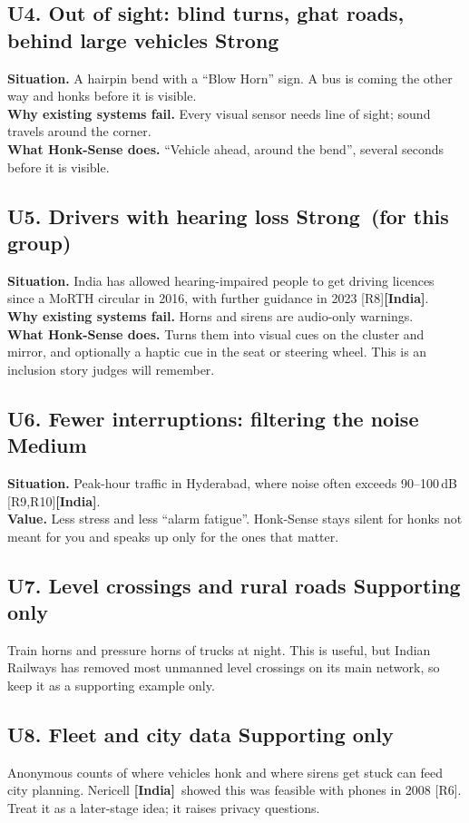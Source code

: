 \documentclass[11pt]{article}
\newcommand{\strong}{{\color{ok}\bfseries Strong}}
\newcommand{\medium}{{\color{amber}\bfseries Medium}}
\newcommand{\weak}{{\color{alert}\bfseries Supporting only}}
\newcommand{\IN}{{\color{sky}\bfseries[India]}}
\renewcommand{\cite}[1]{{\color{navy}[#1]}}
\begin{document}
\subsection{U4. Out of sight: blind turns, ghat roads, behind large vehicles \hfill \strong}
\textbf{Situation.} A hairpin bend with a ``Blow Horn'' sign. A bus is coming the other way and honks before it is visible.\\
\textbf{Why existing systems fail.} Every visual sensor needs line of sight; sound travels around the corner.\\
\textbf{What Honk-Sense does.} ``Vehicle ahead, around the bend'', several seconds before it is visible.

\subsection{U5. Drivers with hearing loss \hfill \strong\ (for this group)}
\textbf{Situation.} India has allowed hearing-impaired people to get driving licences since a MoRTH circular in 2016, with further guidance in 2023 \cite{R8}\IN.\\
\textbf{Why existing systems fail.} Horns and sirens are audio-only warnings.\\
\textbf{What Honk-Sense does.} Turns them into visual cues on the cluster and mirror, and optionally a haptic cue in the seat or steering wheel. This is an inclusion story judges will remember.

\subsection{U6. Fewer interruptions: filtering the noise \hfill \medium}
\textbf{Situation.} Peak-hour traffic in Hyderabad, where noise often exceeds 90--100\,dB \cite{R9,R10}\IN.\\
\textbf{Value.} Less stress and less ``alarm fatigue''. Honk-Sense stays silent for honks not meant for you and speaks up only for the ones that matter.

\subsection{U7. Level crossings and rural roads \hfill \weak}
Train horns and pressure horns of trucks at night. This is useful, but Indian Railways has removed most unmanned level crossings on its main network, so keep it as a supporting example only.

\subsection{U8. Fleet and city data \hfill \weak}
Anonymous counts of where vehicles honk and where sirens get stuck can feed city planning. Nericell \IN\ showed this was feasible with phones in 2008 \cite{R6}. Treat it as a later-stage idea; it raises privacy questions.
\end{document}
